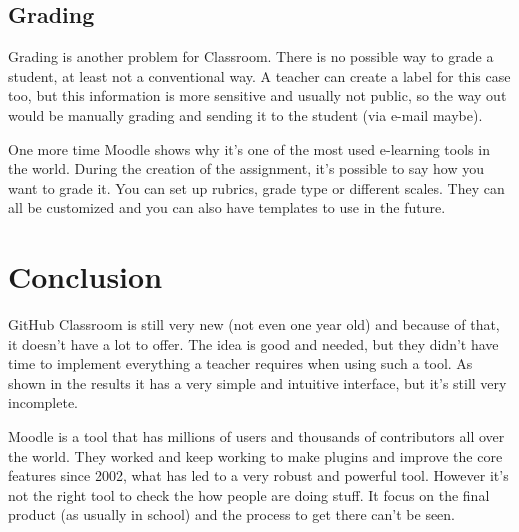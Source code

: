 \documentclass[12pt]{article}
\begin{document}
\subsection{Grading}

Grading is another problem for Classroom. There is no possible way to grade a student, at least not a conventional way. A teacher can create a label for this case too, but this information is more sensitive and usually not public, so the way out would be manually grading and sending it to the student (via e-mail maybe).

One more time Moodle shows why it's one of the most used e-learning tools in the world. During the creation of the assignment, it's possible to say how you want to grade it. You can set up rubrics, grade type or different scales. They can all be customized and you can also have templates to use in the future.

\section{Conclusion}

GitHub Classroom is still very new (not even one year old) and because of that, it doesn't have a lot to offer. The idea is good and needed, but they didn't have time to implement everything a teacher requires when using such a tool. As shown in the results it has a very simple and intuitive interface, but it's still very incomplete.

Moodle is a tool that has millions of users and thousands of contributors all over the world. They worked and keep working to make plugins and improve the core features since 2002, what has led to a very robust and powerful tool. However it's not the right tool to check the how people are doing stuff. It focus on the final product (as usually in school) and the process to get there can't be seen.
\end{document}
